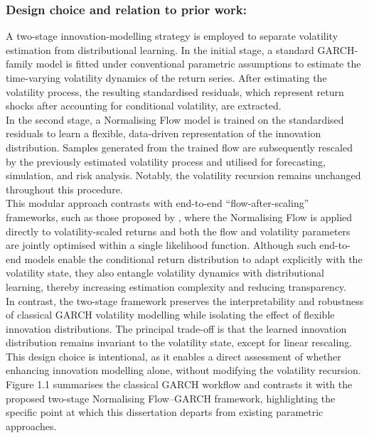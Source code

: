\documentclass[oneside,12pt]{CUEDthesisPSnPDF}
\newcommand{\textcite}{\citet}
\begin{document}
\subsubsection{Design choice and relation to prior work:}
A two-stage innovation-modelling strategy is employed to separate volatility estimation from distributional learning. In the initial stage, a standard GARCH-family model is fitted under conventional parametric assumptions to estimate the time-varying volatility dynamics of the return series. After estimating the volatility process, the resulting standardised residuals, which represent return shocks after accounting for conditional volatility, are extracted.\\

In the second stage, a Normalising Flow model is trained on the standardised residuals to learn a flexible, data-driven representation of the innovation distribution. Samples generated from the trained flow are subsequently rescaled by the previously estimated volatility process and utilised for forecasting, simulation, and risk analysis. Notably, the volatility recursion remains unchanged throughout this procedure.\\

This modular approach contrasts with end-to-end “flow-after-scaling” frameworks, such as those proposed by \textcite{seitz2022garchnf}, where the Normalising Flow is applied directly to volatility-scaled returns and both the flow and volatility parameters are jointly optimised within a single likelihood function. Although such end-to-end models enable the conditional return distribution to adapt explicitly with the volatility state, they also entangle volatility dynamics with distributional learning, thereby increasing estimation complexity and reducing transparency.\\

In contrast, the two-stage framework preserves the interpretability and robustness of classical GARCH volatility modelling while isolating the effect of flexible innovation distributions. The principal trade-off is that the learned innovation distribution remains invariant to the volatility state, except for linear rescaling. This design choice is intentional, as it enables a direct assessment of whether enhancing innovation modelling alone, without modifying the volatility recursion.\\

Figure 1.1 summarises the classical GARCH workflow and contrasts it with the proposed two-stage Normalising Flow–GARCH framework, highlighting the specific point at which this dissertation departs from existing parametric approaches.\\
\end{document}
